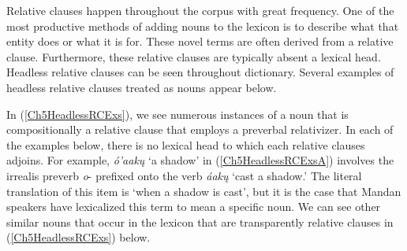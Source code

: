 Relative clauses happen throughout the corpus with great frequency. One of the most productive methods of adding nouns to the lexicon is to describe what that entity does or what it is for. These novel terms are often derived from a relative clause. Furthermore, these relative clauses are typically absent a lexical head. Headless relative clauses can be seen throughout  dictionary. Several examples of headless relative clauses treated as nouns appear below.

In (\ref{Ch5HeadlessRCExs}), we see numerous instances of a noun that is compositionally a relative clause that employs a preverbal relativizer. In each of the examples below, there is no lexical head to which each relative clauses adjoins. For example, \textit{ó'aakų} `a shadow' in (\ref{Ch5HeadlessRCExsA}) involves the irrealis preverb \textit{o}- prefixed onto the verb \textit{áakų} `cast a shadow.' The literal translation of this item is `when a shadow is cast', but it is the case that Mandan speakers have lexicalized this term to mean a specific noun. We can see other similar nouns that occur in the lexicon that are transparently relative clauses in (\ref{Ch5HeadlessRCExs}) below.

